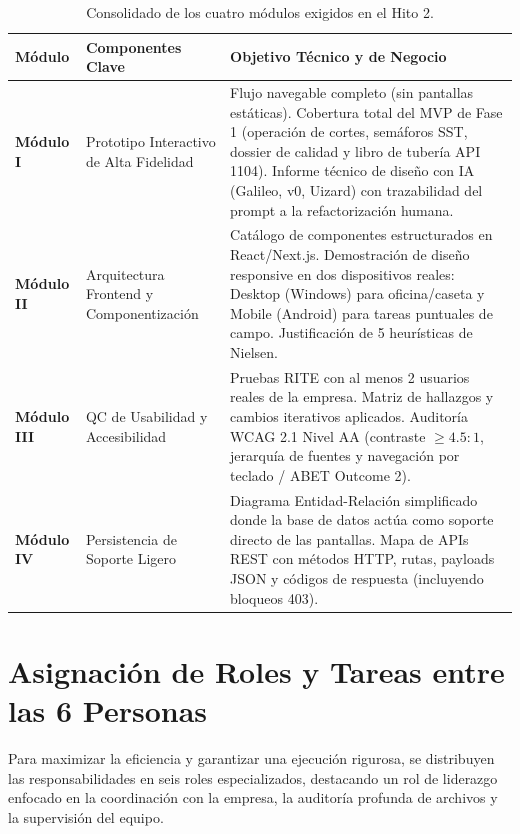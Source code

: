 \documentclass[11pt,letterpaper]{article}
\begin{document}
\begin{table}[H]
\centering
\small
\begin{tabularx}{\textwidth}{@{}l p{4.2cm} X@{}}
\toprule
\rowcolor{docHead}
\textbf{Módulo} & \textbf{Componentes Clave} & \textbf{Objetivo Técnico y de Negocio} \\
\midrule
\textbf{Módulo I} & Prototipo Interactivo de Alta Fidelidad & Flujo navegable completo (sin pantallas estáticas). Cobertura total del MVP de Fase 1 (operación de cortes, semáforos SST, dossier de calidad y libro de tubería API 1104). Informe técnico de diseño con IA (Galileo, v0, Uizard) con trazabilidad del prompt a la refactorización humana. \\
\addlinespace
\textbf{Módulo II} & Arquitectura Frontend y Componentización & Catálogo de componentes estructurados en React/Next.js. Demostración de diseño responsive en dos dispositivos reales: Desktop (Windows) para oficina/caseta y Mobile (Android) para tareas puntuales de campo. Justificación de 5 heurísticas de Nielsen. \\
\addlinespace
\textbf{Módulo III} & QC de Usabilidad y Accesibilidad & Pruebas RITE con al menos 2 usuarios reales de la empresa. Matriz de hallazgos y cambios iterativos aplicados. Auditoría WCAG 2.1 Nivel AA (contraste $\ge 4.5:1$, jerarquía de fuentes y navegación por teclado / ABET Outcome 2). \\
\addlinespace
\textbf{Módulo IV} & Persistencia de Soporte Ligero & Diagrama Entidad-Relación simplificado donde la base de datos actúa como soporte directo de las pantallas. Mapa de APIs REST con métodos HTTP, rutas, payloads JSON y códigos de respuesta (incluyendo bloqueos 403). \\
\bottomrule
\end{tabularx}
\caption{Consolidado de los cuatro módulos exigidos en el Hito 2.}
\end{table}

\section{Asignación de Roles y Tareas entre las 6 Personas}

Para maximizar la eficiencia y garantizar una ejecución rigurosa, se distribuyen las responsabilidades en seis roles especializados, destacando un rol de liderazgo enfocado en la coordinación con la empresa, la auditoría profunda de archivos y la supervisión del equipo.
\end{document}
